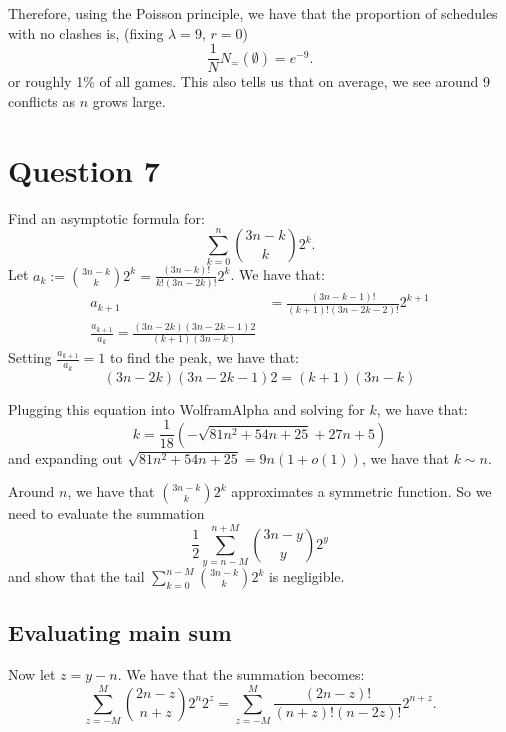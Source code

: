 \documentclass[]{article}
\theoremstyle{definition}
\numberwithin{theorem}{section}
\numberwithin{equation}{section}
\begin{document}
Therefore, using the Poisson principle, we have that the proportion of schedules with no clashes is, (fixing $\lambda = 9$, $r = 0$)
\begin{equation}
	\frac{1}{N} N_=(\emptyset) = e^{-9}.
\end{equation}
or roughly 1\% of all games.
This also tells us that on average, we see around 9 conflicts as $n$ grows large. 

\section{Question 7}
Find an asymptotic formula for:
\begin{equation}
	\sum_{k = 0}^n \binom{3n - k}{k} 2^k.
\end{equation}
Let $a_k := \binom{3n - k}{k} 2^k = \frac{(3n - k)!}{k! (3n - 2k)!} 2^k$.
We have that:
\begin{align*}
	a_{k + 1} &= \frac{(3n - k - 1)!}{(k + 1)! (3n - 2k - 2)!} 2^{k + 1}\\
	\frac{a_{k + 1}}{a_k} = \frac{(3n - 2k)(3n - 2k - 1) 2}{(k + 1)(3n - k)}
\end{align*}
Setting $\frac{a_{k + 1}}{a_k} = 1$ to find the peak, we have that:
\begin{equation}
	(3n - 2k)(3n - 2k - 1) 2 = (k + 1)(3n - k)
\end{equation}

Plugging this equation into WolframAlpha and solving for $k$, we have that:
\begin{equation}
	k = \frac{1}{18}\left(- \sqrt{81 n^2 + 54 n + 25} + 27 n + 5\right)
\end{equation}
and expanding out $\sqrt{81 n^2 + 54 n + 25} = 9 n(1 + o(1))$, we have that
$k \sim n$. 

Around $n$, we have that $\binom{3n - k}{k} 2^k$ approximates a symmetric function. So we need to evaluate the summation
\begin{equation}
	\frac{1}{2}\sum_{y = n - M}^{n + M} \binom{3n - y}{y} 2^y
\end{equation}
and show that the tail $\sum_{k = 0}^{n - M} \binom{3n - k}{k} 2^k$ is negligible.

\subsection{Evaluating main sum}
Now let $z = y - n$. We have that the summation becomes:
\begin{equation}
	\sum_{z = -M}^M \binom{2n - z}{n + z} 2^n 2^z = \sum_{z = -M}^M\frac{(2n - z)!}{(n + z)! (n - 2z)!} 2^{n + z}. 
\end{equation}
\end{document}

